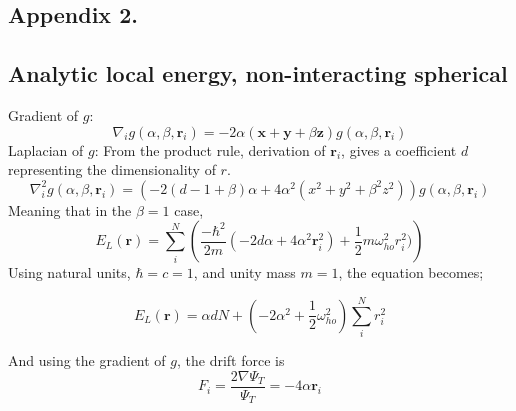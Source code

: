 \documentclass[%
oneside,                 %
final,                   %
10pt]{article}
\begin{document}
\begin{appendices}
\section*{Appendix 2.} \label{APP_2}
\subsection*{Analytic local energy, non-interacting spherical} \label{APP_2:le_1}
Gradient of $g$:
\begin{equation*}
{\nabla }_{i} g(\alpha,\beta,\mathbf{r}_i)=-2\alpha(\bm x + \bm y+ \beta \bm z) g(\alpha,\beta,\mathbf{r}_i)
\end{equation*}
Laplacian of $g$:
From the product rule, derivation of $ \mathbf{r}_i$, gives a coefficient $d$ representing the dimensionality of $r$. 
\begin{equation*}
{\nabla }_{i}^2  g(\alpha,\beta,\mathbf{r}_i)=  (-2(d-1+\beta) \alpha  + 4 \alpha^2  (x^2 + y^2 + \beta^2 z^2)) g(\alpha,\beta,\mathbf{r}_i)
\end{equation*}
Meaning that in the $\beta=1$ case,
\begin{equation*}
        E_L(\mathbf{r}) =  \sum_i^N \left(\frac{-\hbar^2}{2m}(-2 d \alpha + 4 \alpha^2  \mathbf{r}_i^2) + \frac{1}{2}m\omega_{ho}^2r_i^2 )\right)  
 \end{equation*}
Using natural units, $\hbar=c=1$, and unity mass $m=1$, the equation becomes;

\begin{equation*}
        E_L(\mathbf{r}) =  \alpha d N + \left( - 2 \alpha^2    + \frac{1}{2} \omega_{ho}^2\right)  \sum_i^N r_i^2 
\end{equation*}

And using the gradient of $g$, the drift force is
\begin{equation*}
F_i = \frac{2\nabla \Psi_T}{\Psi_T}= -4\alpha \mathbf{r}_i 
\end{equation*}


\end{appendices}
\end{document}
